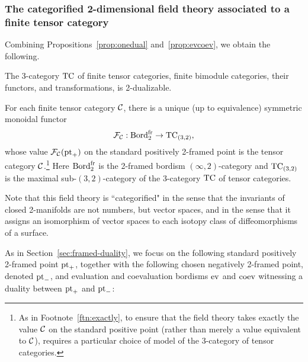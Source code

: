\documentclass{amsart}
\begin{document}
\subsubsection{The categorified 2-dimensional field theory associated to a finite tensor category}

Combining Propositions~\ref{prop:onedual} and~\ref{prop:evcoev}, we obtain the following.
\begin{theorem} \label{thm:TC_is_2Dualizable}
The 3-category $\mathrm{TC}$ of finite tensor categories, finite bimodule categories, their functors, and transformations, is 2-dualizable.
\end{theorem}
\begin{corollary}
For each finite tensor category $\mathcal C$, there is a unique (up to equivalence) symmetric monoidal functor
\[
\mathcal F_\mathcal C : \mathrm{Bord}^\mathrm{fr}_2 \rightarrow \mathrm{TC}_{(3,2)},
\]
whose value $\mathcal F_\mathcal C(\mathrm{pt}_+)$ on the standard positively 2-framed point is the tensor category $\mathcal C$.\footnote{As in Footnote~\ref{ftn:exactly}, to ensure that the field theory takes exactly the value $\mathcal C$ on the standard positive point (rather than merely a value equivalent to $\mathcal C$), requires a particular choice of model of the 3-category of tensor categories.}  Here $\mathrm{Bord}^\mathrm{fr}_2$ is the 2-framed bordism $(\infty,2)$-category and $\mathrm{TC}_{(3,2)}$ is the maximal sub-$(3,2)$-category of the 3-category $\mathrm{TC}$ of tensor categories.
\end{corollary}

\nid Note that this field theory is ``categorified" in the sense that the invariants of closed 2-manifolds are not numbers, but vector spaces, and in the sense that it assigns an isomorphism of vector spaces to each isotopy class of diffeomorphisms of a surface.

As in Section~\ref{sec:framed-duality}, we focus on the following standard positively 2-framed point $\mathrm{pt}_+$, together with the following chosen negatively 2-framed point, denoted $\mathrm{pt}_-$, and evaluation and coevaluation bordisms $\mathrm{ev}$ and $\mathrm{coev}$ witnessing a duality between $\mathrm{pt}_+$ and $\mathrm{pt}_-$:
\end{document}

